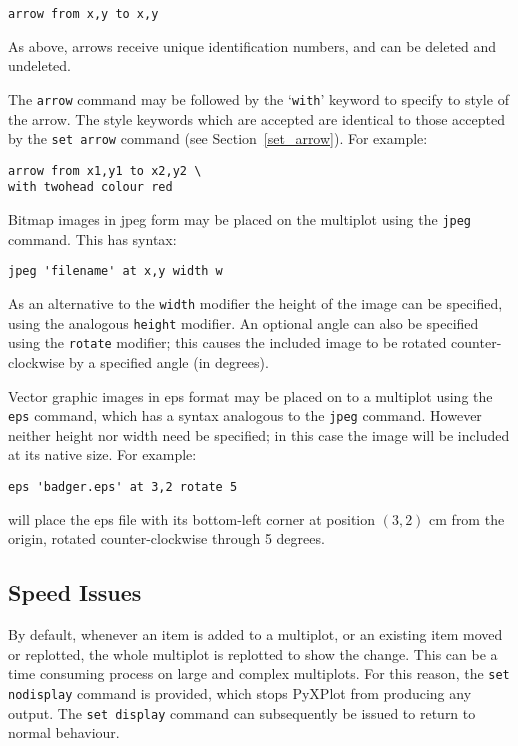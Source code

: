 \documentclass[a4paper,onecolumn,11pt]{book}
\begin{document}
\begin{verbatim} 
arrow from x,y to x,y
\end{verbatim}

As above, arrows receive unique identification numbers, and can be deleted and
undeleted.

The \texttt{arrow} command may be followed by the `\texttt{with}' keyword to
specify to style of the arrow. The style keywords which are accepted are
identical to those accepted by the \texttt{set arrow} command (see
Section~\ref{set_arrow}). For example:

\begin{verbatim} 
arrow from x1,y1 to x2,y2 \
with twohead colour red
\end{verbatim}

 Bitmap images in jpeg form may be
placed on the multiplot using the {\tt jpeg} command.  This has syntax:

\begin{verbatim}
jpeg 'filename' at x,y width w
\end{verbatim}

As an alternative to the {\tt width} modifier the height of the image can be
specified, using the analogous {\tt height} modifier.  An optional angle can
also be specified using the {\tt rotate} modifier; this causes the included
image to be rotated counter-clockwise by a specified angle (in degrees).

 Vector graphic images in eps format may
be placed on to a multiplot using the {\tt eps} command, which has a syntax
analogous to the {\tt jpeg} command.  However neither height nor width need be
specified; in this case the image will be included at its native size.  For
example:

\begin{verbatim}
eps 'badger.eps' at 3,2 rotate 5
\end{verbatim}

\noindent will place the eps file with its bottom-left corner at position
$(3,2)$ cm from the origin, rotated counter-clockwise through 5 degrees.

\subsection{Speed Issues}
\label{set_display}

By default, whenever an item is added to a multiplot, or an existing item moved
or replotted, the whole multiplot is replotted to show the change. This can be
a time consuming process on large and complex multiplots. For this reason, the
\texttt{set nodisplay}\index{set display command@\texttt{set display} command}
command is provided, which stops PyXPlot from producing any output. The
\texttt{set display} command can subsequently be issued to return to normal
behaviour.
\end{document}

